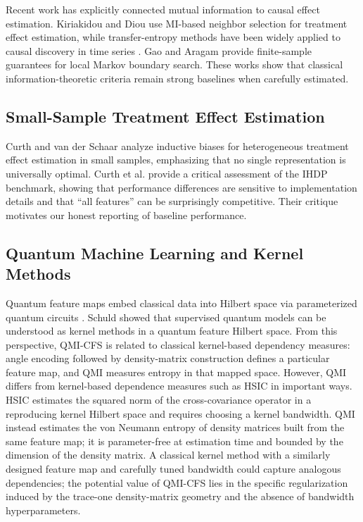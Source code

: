 \documentclass{svproc}
\begin{document}
Recent work has explicitly connected mutual information to causal effect estimation. Kiriakidou and Diou \cite{kiriakidou2024mutual} use MI-based neighbor selection for treatment effect estimation, while transfer-entropy methods have been widely applied to causal discovery in time series \cite{schreiber2000measuring}. Gao and Aragam \cite{gao2021efficient} provide finite-sample guarantees for local Markov boundary search. These works show that classical information-theoretic criteria remain strong baselines when carefully estimated.

\subsection{Small-Sample Treatment Effect Estimation}

Curth and van der Schaar \cite{curth2021inductive} analyze inductive biases for heterogeneous treatment effect estimation in small samples, emphasizing that no single representation is universally optimal. Curth et al. \cite{curth2021really} provide a critical assessment of the IHDP benchmark, showing that performance differences are sensitive to implementation details and that ``all features'' can be surprisingly competitive. Their critique motivates our honest reporting of baseline performance.

\subsection{Quantum Machine Learning and Kernel Methods}

Quantum feature maps embed classical data into Hilbert space via parameterized quantum circuits \cite{havlivcek2019supervised}. Schuld \cite{schuld2021supervised} showed that supervised quantum models can be understood as kernel methods in a quantum feature Hilbert space. From this perspective, QMI-CFS is related to classical kernel-based dependency measures: angle encoding followed by density-matrix construction defines a particular feature map, and QMI measures entropy in that mapped space. However, QMI differs from kernel-based dependence measures such as HSIC \cite{gretton2005measuring,gretton2007kernel,gretton2012kernel} in important ways. HSIC estimates the squared norm of the cross-covariance operator in a reproducing kernel Hilbert space and requires choosing a kernel bandwidth. QMI instead estimates the von Neumann entropy of density matrices built from the same feature map; it is parameter-free at estimation time and bounded by the dimension of the density matrix. A classical kernel method with a similarly designed feature map and carefully tuned bandwidth could capture analogous dependencies; the potential value of QMI-CFS lies in the specific regularization induced by the trace-one density-matrix geometry and the absence of bandwidth hyperparameters.
\end{document}
